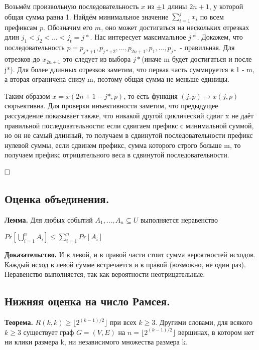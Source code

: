 \documentclass[a4paper, 10pt]{article}
\begin{document}
Возьмём произвольную последовательность $x$ из $\pm 1$ длины $2n + 1$, у которой общая сумма равна 1. Найдём минимальное значение $\sum_{i = 1}^{j} x_i$ по всем префиксам $p$. Обозначим его $m$, оно может достигаться на нескольких отрезках длин $j_1 < j_2 < \dots < j_t = j*$. Нас интересует максимальное $j*$. Докажем, что последовательность $p = p_{j* + 1}, p_{j* + 2}, \dots, p_{2n + 1}, p_{1}, \dots, p_{j*} $ - правильная. Для отрезков до $x_{2n + 1}$ это следует из выбора $j*$(иначе m будет достигаться и после j*). Для более длинных отрезков заметим, что первая часть суммируется в 1 - m, а вторая ограничена снизу m, поэтому общая сумма не меньше единицы.

Таким образом $x = x(2n + 1 - j*, p)$, то есть функция $(j, p) \to x(j, p)$ сюръективна. Для проверки инъективности заметим, что предыдущее рассуждение показывает также, что никакой другой циклический сдвиг x не даёт правильной последовательности: если сдвигаем префикс с минимальной суммой, но он не самый длинный, то получаем в сдвинутой последовательности префикс нулевой суммы, если сдвинем префикс, сумма которого строго больше m, то получаем префикс отрицательного веса в сдвинутой последовательности.

$\hfill \square$


\subsection{Оценка объединения.}

\textbf{Лемма.} Для любых событий $A_1, \dots, A_n \subseteq U$ выполняется неравенство

\begin{center}
     $\displaystyle Pr[\bigcup_{i = 1}^n A_i] \leqslant \sum_{i = 1}^n Pr[A_i]$
\end{center}

\textbf{Доказательство.} И в левой, и в правой части стоит сумма вероятностей исходов. Каждый исход в левой сумме встречается и в правой (возможно, не один раз). Неравенство выполняется, так как вероятности неотрицательные.

\subsection{Нижняя оценка на число Рамсея.}

\textbf{Теорема.} $R(k,k) \geqslant \lfloor 2^{(k-1)/2} \rfloor$ при всех $k \geqslant 3$. Другими словами, для всякого $k \geqslant 3$ существует граф $G = (V,E)$ на $n = \lfloor 2^{(k-1)/2}\rfloor $ вершинах, в котором нет ни клики размера k, ни независимого множества размера k.
\end{document}
